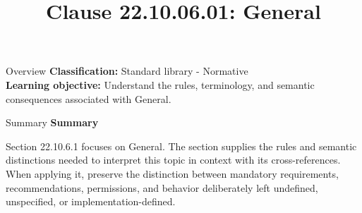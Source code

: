 \documentclass[10pt,letterpaper]{article}
\title{Clause 22.10.06.01: General}
\author{}
\date{}
\begin{document}
\maketitle
\begin{CornellOverviewBox}{Overview}
\textbf{Classification:} Standard library - Normative\\[2pt]
\textbf{Learning objective:} Understand the rules, terminology, and semantic consequences associated with General.
\end{CornellOverviewBox}\begin{CornellSummaryBox}{Summary}
{\sffamily\bfseries\color{Accent} Summary}\par\vspace{3pt}Section 22.10.6.1 focuses on General. The section supplies the rules and semantic distinctions needed to interpret this topic in context with its cross-references. When applying it, preserve the distinction between mandatory requirements, recommendations, permissions, and behavior deliberately left undefined, unspecified, or implementation-defined.
\end{CornellSummaryBox}
\end{document}
